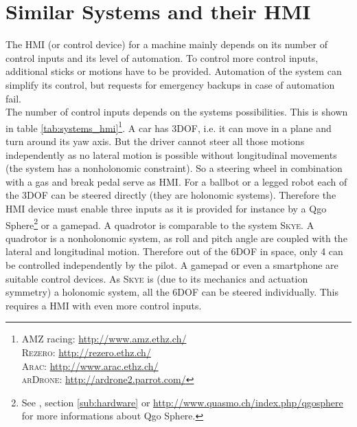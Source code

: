 \section{Similar Systems and their HMI}
\label{sec:similar systems}
The HMI (or control device) for a machine mainly depends on its number of control inputs and its level of automation. To control more control inputs, additional sticks or motions have to be provided. Automation of the system can simplify its control, but requests for emergency backups in case of automation fail. \\
The number of control inputs depends on the systems possibilities. This is shown in table \ref{tab:systems_hmi}\footnote{\textsc{AMZ} racing: \url{http://www.amz.ethz.ch/} \\ \textsc{Rezero}: \url{http://rezero.ethz.ch/} \\ \textsc{Arac}: \url{http://www.arac.ethz.ch/} \\ \textsc{arDrone}: \url{http://ardrone2.parrot.com/}}. A car has 3DOF, i.e. it can move in a plane and turn around its yaw axis. But the driver cannot steer all those motions independently as no lateral motion is possible without longitudinal movements (the system has a nonholonomic constraint). So a steering wheel in combination with a gas and break pedal serve as HMI. For a ballbot or a legged robot each of the 3DOF can be steered directly (they are holonomic systems). Therefore the HMI device must enable three inputs as it is provided for instance by a Qgo Sphere\footnote{See \cite{kammermann}, section \ref{sub:hardware} or \url{http://www.quasmo.ch/index.php/qgosphere} for more informations about Qgo Sphere.} or a gamepad. A quadrotor is comparable to the system \textsc{Skye}. A quadrotor is a nonholonomic system, as roll and pitch angle are coupled with the lateral and longitudinal motion. Therefore out of the 6DOF in space, only 4 can be controlled independently by the pilot. A gamepad or even a smartphone are suitable control devices. As \textsc{Skye} is (due to its mechanics and actuation symmetry) a holonomic system, all the 6DOF can be steered individually. This requires a HMI with even more control inputs.

